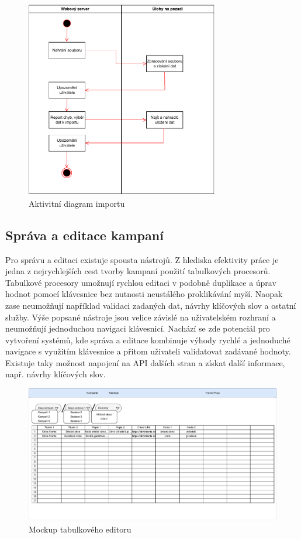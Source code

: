 \begin{figure}[h]
    \centering
    \includegraphics[width=0.75\textwidth]{Figures/import-activity-diagram.pdf}
    \caption{Aktivitní diagram importu}
    \label{fig:import-activity-diagram}
\end{figure}

\subsection{Správa a editace kampaní}
\label{subsec:edit-campaigns}
Pro správu a editaci existuje spousta nástrojů. Z hlediska efektivity práce je jedna z nejrychlejších cest tvorby kampaní použití tabulkových procesorů. Tabulkové procesory
umožnují rychlou editaci v podobně duplikace a úprav hodnot pomocí klávesnice bez nutnosti neustálého proklikávání myší. Naopak zase neumožňují například validaci
zadaných dat, návrhy klíčových slov a ostatní služby. Výše popsané nástroje jsou velice závislé na uživatelském rozhraní a neumožňují jednoduchou navigaci klávesnicí.
Nachází se zde potenciál pro vytvoření systémů, kde správa a editace kombinuje výhody rychlé a jednoduché navigace s využitím klávesnice a přitom uživateli validatovat
zadávané hodnoty. Existuje taky možnost napojení na API dalších stran a získat další informace, např. návrhy klíčových slov.

\begin{figure}[h]
    \centering
    \includegraphics[width=1\textwidth]{Figures/datagrid-mockup.pdf}
    \caption{Mockup tabulkového editoru}
    \label{fig:datagrid-mockup}
\end{figure}

